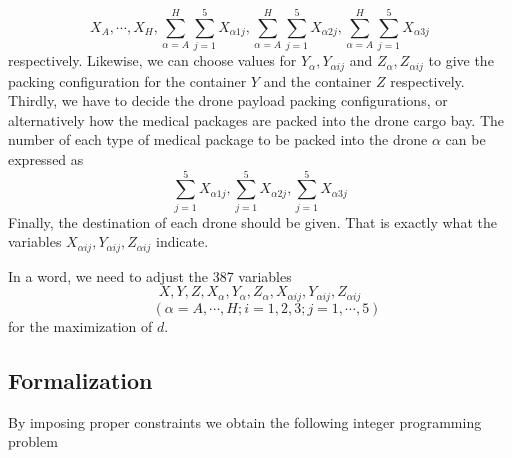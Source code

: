 \documentclass{mcmthesis}
\begin{document}
\begin{equation*}
	X_A,\cdots,X_H,\sum_{\alpha=A}^H\sum_{j=1}^{5}X_{\alpha 1j},\sum_{\alpha=A}^H\sum_{j=1}^{5}X_{\alpha 2j},\sum_{\alpha=A}^H\sum_{j=1}^{5}X_{\alpha 3j}
\end{equation*} 
respectively. Likewise, we can choose values for $Y_\alpha,Y_{\alpha ij}$ and $Z_{\alpha},Z_{\alpha ij}$ to give the packing configuration for the container $Y$ and the container $Z$ respectively. Thirdly, we have to decide the drone payload packing configurations, or alternatively how the medical packages are packed into the drone cargo bay. The number of each type of medical package to be packed into the drone $\alpha$ can be expressed as
\begin{equation*}
\sum_{j=1}^{5}X_{\alpha 1j},\sum_{j=1}^{5}X_{\alpha 2j},\sum_{j=1}^{5}X_{\alpha 3j}
\end{equation*} Finally, the destination of each drone should be given. That is exactly what the variables $X_{\alpha ij},Y_{\alpha ij},Z_{\alpha ij}$ indicate. 

\noindent In a word, we need to adjust the 387 variables
\[
X,Y,Z,X_{\alpha},Y_{\alpha},Z_{\alpha},X_{\alpha ij},Y_{\alpha ij},Z_{\alpha ij}
\]
\[
\quad(\alpha=A,\cdots,H;i=1,2,3;j=1,\cdots,5)
\]
for the maximization of $d$.

\subsection{Formalization}

\noindent By imposing proper constraints we obtain the following integer programming problem
\end{document}
